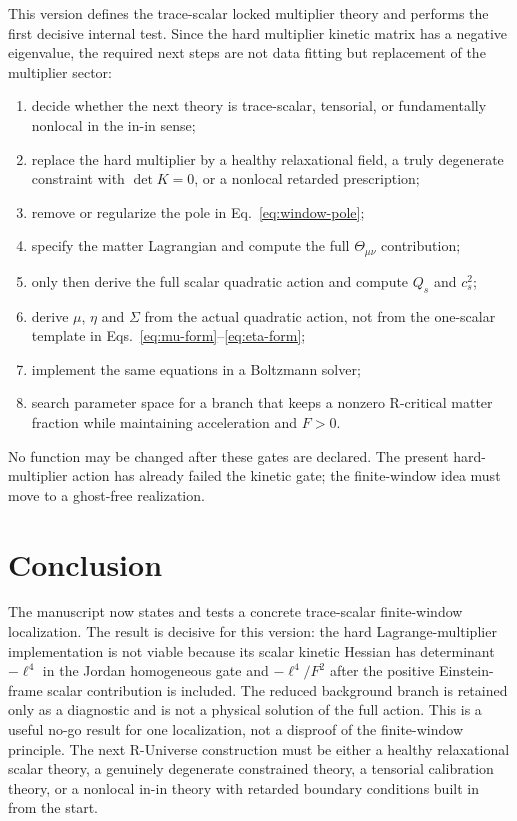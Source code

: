 \documentclass[12pt,a4paper]{article}
\begin{document}
This version defines the trace-scalar locked multiplier theory and performs the first decisive internal test. Since the hard multiplier kinetic matrix has a negative eigenvalue, the required next steps are not data fitting but replacement of the multiplier sector:
\begin{enumerate}
\item decide whether the next theory is trace-scalar, tensorial, or fundamentally nonlocal in the in-in sense;
\item replace the hard multiplier by a healthy relaxational field, a truly degenerate constraint with $\det K=0$, or a nonlocal retarded prescription;
\item remove or regularize the pole in Eq.~\eqref{eq:window-pole};
\item specify the matter Lagrangian and compute the full $\Theta_{\mu\nu}$ contribution;
\item only then derive the full scalar quadratic action and compute $Q_s$ and $c_s^2$;
\item derive $\mu$, $\eta$ and $\Sigma$ from the actual quadratic action, not from the one-scalar template in Eqs.~\eqref{eq:mu-form}--\eqref{eq:eta-form};
\item implement the same equations in a Boltzmann solver;
\item search parameter space for a branch that keeps a nonzero R-critical matter fraction while maintaining acceleration and $F>0$.
\end{enumerate}
No function may be changed after these gates are declared. The present hard-multiplier action has already failed the kinetic gate; the finite-window idea must move to a ghost-free realization.

\section{Conclusion}

The manuscript now states and tests a concrete trace-scalar finite-window localization. The result is decisive for this version: the hard Lagrange-multiplier implementation is not viable because its scalar kinetic Hessian has determinant $-\ell^4$ in the Jordan homogeneous gate and $-\ell^4/F^2$ after the positive Einstein-frame scalar contribution is included. The reduced background branch is retained only as a diagnostic and is not a physical solution of the full action. This is a useful no-go result for one localization, not a disproof of the finite-window principle. The next R-Universe construction must be either a healthy relaxational scalar theory, a genuinely degenerate constrained theory, a tensorial calibration theory, or a nonlocal in-in theory with retarded boundary conditions built in from the start.
\end{document}
